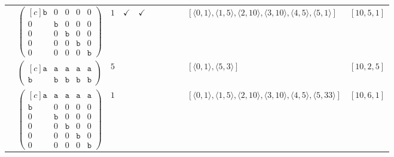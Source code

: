 \documentclass[12pt]{article}
\theoremstyle{definition}
\theoremstyle{plain}
\begin{document}
{\begin{longtable}{@{}cYcccccccZc@{}}
\cmidrule(lr){2-11}

& $\begin{pmatrix*}[c]
\mathtt{b}  &  0  &  0  &  0  &  0  \\
0  &  \mathtt{b}  &  0  &  0  &  0  \\
0  &  0  &  \mathtt{b}  &  0 &  0   \\
0  &  0  &  0  &  \mathtt{b}  &  0  \\
0  &  0  &  0  &  0  &  \mathtt{b}
\end{pmatrix*}$
& $1$
& $\checkmark$
& $\checkmark$
&
&
&
&
& $[\langle0,1\rangle,\allowbreak\langle1,5\rangle,\allowbreak\langle2,10\rangle,\allowbreak\langle3,10\rangle,\allowbreak\langle4,5\rangle,\allowbreak\langle5,1\rangle]$
& $[10,5,1]$     \\

\cmidrule(lr){2-11}

& $\begin{pmatrix*}[c]
\mathtt{a}  &  \mathtt{a}  &  \mathtt{a}  &  \mathtt{a}  &  \mathtt{a}  \\
\mathtt{b}  &  \mathtt{b}  &  \mathtt{b}  &  \mathtt{b}  &  \mathtt{b}
\end{pmatrix*}$
& $5$
&
&
&
&
&
&
& $[\langle0,1\rangle,\allowbreak\langle5,3\rangle]$
& $[10,2,5]$     \\

\cmidrule(lr){2-11}


& $\begin{pmatrix*}[c]
\mathtt{a}  &  \mathtt{a}  &  \mathtt{a}  &  \mathtt{a}  &  \mathtt{a}  \\
\mathtt{b}  &  0  &  0  &  0  &  0  \\
0  &  \mathtt{b}  &  0  &  0  &  0  \\
0  &  0  &  \mathtt{b}  &  0 &  0   \\
0  &  0  &  0  &  \mathtt{b}  &  0  \\
0  &  0  &  0  &  0  &  \mathtt{b}
\end{pmatrix*}$
& $1$
&
&
&
&
&
&
& $[\langle0,1\rangle,\allowbreak\langle1,5\rangle,\allowbreak\langle2,10\rangle,\allowbreak\langle3,10\rangle,\allowbreak\langle4,5\rangle,\allowbreak\langle5,33\rangle]$
& $[10,6,1]$\\

\cmidrule(lr){2-11}



\end{longtable}}
\end{document}

